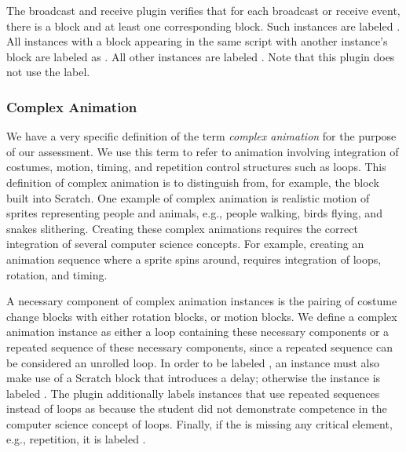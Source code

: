 The broadcast and receive plugin verifies that for each broadcast or receive
event, there is a \broadcast{} block and at least one corresponding \receive{}
block. Such instances are labeled \correct{}. All instances with a \broadcast{}
block appearing in the same script with another instance's \broadcast{} block
are labeled as \semincor{}. All other instances are labeled \incom{}. Note that
this plugin does not use the \incor{} label.

\subsubsection{Complex Animation}
We have a very specific definition of the term \emph{complex animation} for the
purpose of our assessment.  We use this term to refer to animation involving
integration of costumes, motion, timing, and repetition control structures such
as loops. This definition of complex animation is to distinguish from, for
example, the \glideto{} block built into Scratch.  One example of complex
animation is realistic motion of sprites representing people and animals, e.g.,
people walking, birds flying, and snakes slithering.  Creating these complex
animations requires the correct integration of several computer science
concepts. For example, creating an animation sequence where a sprite spins
around, requires integration of loops, rotation, and timing.

A necessary component of complex animation instances is the pairing of costume
change blocks with either rotation blocks, or motion blocks. We define a
complex animation instance as either a loop containing these necessary
components or a repeated sequence of these necessary components, since a
repeated sequence can be considered an unrolled loop. In order to be labeled
\correct{}, an instance must also make use of a Scratch block that introduces a
delay; otherwise the instance is labeled \semincor{}. The plugin additionally
labels instances that use repeated sequences instead of loops as \semincor{}
because the student did not demonstrate competence in the computer science
concept of loops. Finally, if the \sprogram{} is missing any critical element,
e.g., repetition, it is labeled \incom{}.
